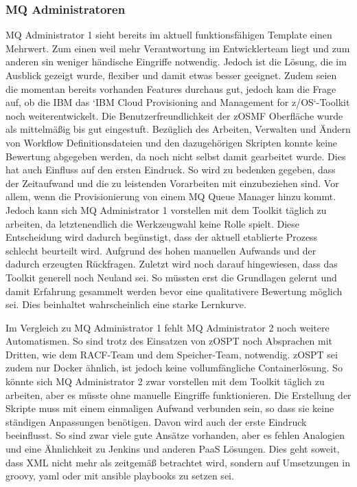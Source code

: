 \subsubsection{MQ Administratoren}
MQ Administrator 1 sieht bereits im aktuell funktionsfähigen Template einen Mehrwert.
Zum einen weil mehr Verantwortung im Entwicklerteam liegt und zum anderen sin weniger händische Eingriffe notwendig.
Jedoch ist die Lösung, die im Ausblick gezeigt wurde, flexiber und damit etwas besser geeignet.
Zudem seien die momentan bereits vorhanden Features durchaus gut, jedoch kam die Frage auf, ob die IBM das `IBM Cloud Provisioning and Management for z/OS`-Toolkit noch weiterentwickelt.
Die Benutzerfreundlichkeit der zOSMF Oberfläche wurde als mittelmäßig bis gut eingestuft.
Bezüglich des Arbeiten, Verwalten und Ändern von Workflow Definitionsdateien und den dazugehörigen Skripten konnte keine Bewertung abgegeben werden, da noch nicht selbst damit gearbeitet wurde.
Dies hat auch Einfluss auf den ersten Eindruck.
So wird zu bedenken gegeben, dass der Zeitaufwand und die zu leistenden Vorarbeiten mit einzubeziehen sind.
Vor allem, wenn die Provisionierung von einem MQ Queue Manager hinzu kommt.
Jedoch kann sich MQ Administrator 1 vorstellen mit dem Toolkit täglich zu arbeiten, da letztenendlich die Werkzeugwahl keine Rolle spielt.
Diese Entscheidung wird dadurch begünstigt, dass der aktuell etablierte Prozess schlecht beurteilt wird.
Aufgrund des hohen manuellen Aufwands und der dadurch erzeugten Rückfragen.
Zuletzt wird noch darauf hingewiesen, dass das Toolkit generell noch Neuland sei.
So müssten erst die Grundlagen gelernt und damit Erfahrung gesammelt werden bevor eine qualitativere Bewertung möglich sei.
Dies beinhaltet wahrscheinlich eine starke Lernkurve.

Im Vergleich zu MQ Administrator 1 fehlt MQ Administrator 2 noch weitere Automatismen.
So sind trotz des Einsatzen von zOSPT noch Absprachen mit Dritten, wie dem RACF-Team und dem Speicher-Team, notwendig.
zOSPT sei zudem nur Docker ähnlich, ist jedoch keine vollumfängliche Containerlösung.
So könnte sich MQ Administrator 2 zwar vorstellen mit dem Toolkit täglich zu arbeiten, aber es müsste ohne manuelle Eingriffe funktionieren.
Die Erstellung der Skripte muss mit einem einmaligen Aufwand verbunden sein, so dass sie keine ständigen Anpassungen benötigen.
Davon wird auch der erste Eindruck beeinflusst.
So sind zwar viele gute Ansätze vorhanden, aber es fehlen Analogien und eine Ähnlichkeit zu Jenkins und anderen PaaS Lösungen.
Dies geht soweit, dass XML nicht mehr als zeitgemäß betrachtet wird, sondern auf Umsetzungen in groovy, yaml oder mit ansible playbooks zu setzen sei.


